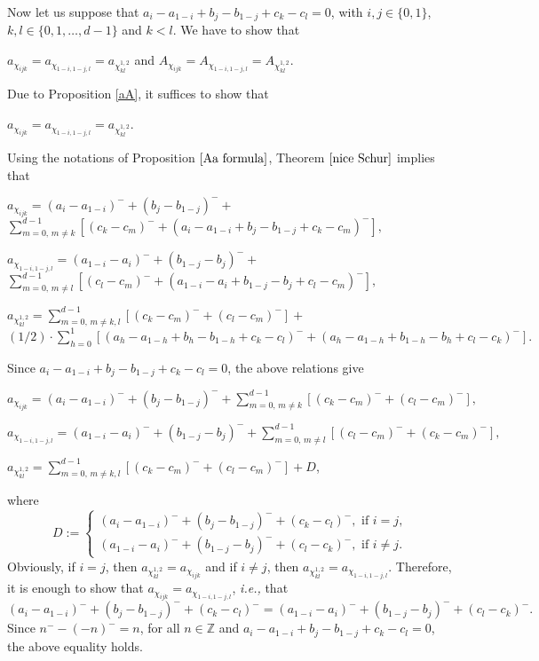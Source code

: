 \documentclass[10pt,a4paper,titlepage]{article}
\newcommand{\ie}{\emph{i.e., }}
\begin{document}
\begin{apod}
{Now let us suppose that $a_i-a_{1-i}+b_j-b_{1-j}+c_k-c_l=0$, with $i,j \in \{0,1\}$,  $k,l \in \{0,1,\ldots,d-1\}$ and $k< l$. We have to show that 
\begin{center}
$a_{\chi_{ijk}}=a_{\chi_{1-i,1-j,l}}=a_{\chi_{kl}^{1,2}}$ and 
$A_{\chi_{ijk}}=A_{\chi_{1-i,1-j,l}}=A_{\chi_{kl}^{1,2}}$.
\end{center}
Due to Proposition \ref{aA}, it suffices to show that
\begin{center}
$a_{\chi_{ijk}}=a_{\chi_{1-i,1-j,l}}=a_{\chi_{kl}^{1,2}}$.
\end{center}
Using the notations of Proposition $\ref{Aa formula}$, Theorem $\ref{nice Schur}$ implies that
\begin{center}
$a_{\chi_{ijk}}=(a_i-a_{1-i})^- + (b_j-b_{1-j})^- +$\\ $\sum_{m=0,\,m\neq k}^{d-1} [(c_k-c_m)^- +
(a_i-a_{1-i}+b_j-b_{1-j}+c_k-c_m)^-],$
\end{center}
\begin{center}
$a_{\chi_{1-i,1-j,l}}=(a_{1-i}-a_{i})^- + (b_{1-j}-b_{j})^- +$\\ 
$\sum_{m=0,\,m\neq l}^{d-1} [(c_l-c_m)^- +
(a_{1-i}-a_i+b_{1-j}-b_{j}+c_l-c_m)^-],$
\end{center}
\begin{center}
$a_{\chi_{kl}^{1,2}}=\sum_{m=0,\,m\neq k,l}^{d-1}[( c_k-c_m)^-+(c_l-c_m)^-]+$ 
$(1/2)\cdot\sum_{h=0}^1 [(a_h-a_{1-h}+b_h-b_{1-h}+c_k-c_l)^- +(a_h-a_{1-h}+b_{1-h}-b_{h}+c_l-c_k)^-].$
\end{center}
Since $a_i-a_{1-i}+b_j-b_{1-j}+c_k-c_l=0$, the above relations give
\begin{center}
$a_{\chi_{ijk}}=(a_i-a_{1-i})^- + (b_j-b_{1-j})^- + \sum_{m=0,\,m\neq k}^{d-1} [(c_k-c_m)^- +
(c_l-c_m)^-],$
\end{center}
\begin{center}
$a_{\chi_{1-i,1-j,l}}=(a_{1-i}-a_{i})^- + (b_{1-j}-b_{j})^- + 
\sum_{m=0,\,m\neq l}^{d-1} [(c_l-c_m)^- +(c_k-c_m)^-],$
\end{center}
\begin{center}
$a_{\chi_{kl}^{1,2}}=
\sum_{m=0,\,m\neq k,l}^{d-1}[( c_k-c_m)^-+(c_l-c_m)^-]+D$,
\end{center}
 where
$$D:=
\left\{
\begin{array}{ll} 
(a_i-a_{1-i})^-+(b_j-b_{1-j})^-+(c_k-c_l)^-,\textrm{ if }i=j,\\
(a_{1-i}-a_i)^-+(b_{1-j}-b_j)^-+(c_l-c_k)^-, \textrm{ if }i \neq j.
\end{array} \right.$$
Obviously, if $i=j$, then
$a_{\chi_{kl}^{1,2}}=a_{\chi_{ijk}}$ and if $i \neq j$, then
$a_{\chi_{kl}^{1,2}}=a_{\chi_{1-i,1-j,l}}$.
Therefore, it is enough to show that 
$a_{\chi_{ijk}}=a_{\chi_{1-i,1-j,l}}$, \ie that
$$(a_i-a_{1-i})^-+(b_j-b_{1-j})^-+(c_k-c_l)^-=(a_{1-i}-a_i)^-+(b_{1-j}-b_j)^-+(c_l-c_k)^-.$$
Since $n^--(-n)^-=n$, for all $n \in \mathbb{Z}$ and
 $a_i-a_{1-i}+b_j-b_{1-j}+c_k-c_l=0$, the above equality holds.}
\end{apod}
\end{document}
